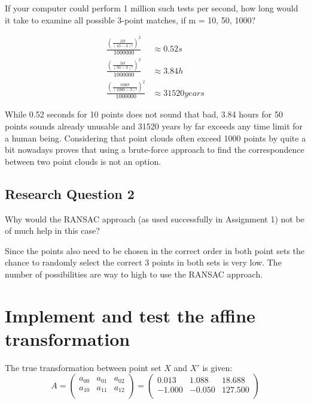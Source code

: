 \begin{itshape}
	If your computer could perform 1 million such tests per second, how long would it take to examine all possible 3-point matches, if m = 10, 50, 1000?	
\end{itshape}

\begin{align}
	\frac{\left(\frac{10!}{(10-3)!}\right)^2}{1000000}& \approx 0.52s\\
	\frac{\left(\frac{50!}{(50-3)!}\right)^2}{1000000}& \approx 3.84h\\
	\frac{\left(\frac{1000!}{(1000-3)!}\right)^2}{1000000}& \approx 31520 years
	\label{timeForTest1000}
\end{align}

While 0.52 seconds for 10 points does not sound that bad, 3.84 hours for 50 points sounds already unusable and 31520 years by far exceeds any time limit for a human being. Considering that point clouds often exceed 1000 points by quite a bit nowadays proves that using a brute-force approach to find the correspondence between two point clouds is not an option.

\subsection{Research Question 2}

\begin{itshape}
	Why would the RANSAC approach (as used successfully in Assignment 1) not be of much help in this case?
\end{itshape}

Since the points also need to be chosen in the correct order in both point sets the chance to randomly select the correct 3 points in both sets is very low. The number of possibilities are way to high to use the RANSAC approach.

\section{Implement and test the affine transformation}

The true transformation between point set $X$ and $X'$ is given:
\begin{equation}
\label{eq:transMatrix}
	A = 
	\begin{pmatrix}
		a_{00} & a_{01} & a_{02} \\
		a_{10} & a_{11} & a_{12} \\
	\end{pmatrix} 
	=
	\begin{pmatrix}
		0.013 & 1.088 & 18.688 \\
		-1.000 & - 0.050 & 127.500\\
	\end{pmatrix}
\end{equation}


